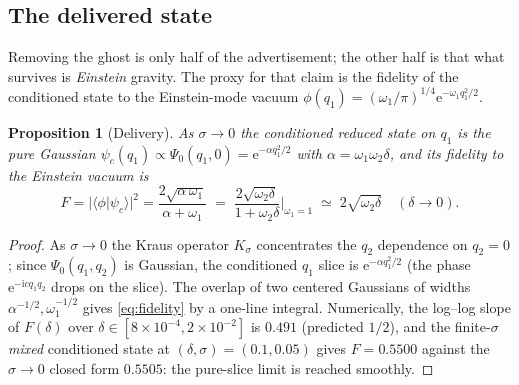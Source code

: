 \documentclass[11pt]{article}
\newtheorem{proposition}[theorem]{Proposition}
\theoremstyle{definition}
\theoremstyle{remark}
\newcommand{\ii}{\mathrm{i}}
\newcommand{\ee}{\mathrm{e}}
\begin{document}
\subsection{The delivered state}

Removing the ghost is only half of the advertisement; the other half
is that what survives is \emph{Einstein} gravity. The proxy for that
claim is the fidelity of the conditioned state to the Einstein-mode
vacuum $\phi(q_{1})=(\omega_{1}/\pi)^{1/4}
\ee^{-\omega_{1}q_{1}^{2}/2}$.

\begin{proposition}[Delivery]
\label{prop:delivery}
As $\sigma\to0$ the conditioned reduced state on $q_{1}$ is the pure
Gaussian $\psi_{c}(q_{1})\propto\Psi_{0}(q_{1},0)
=\ee^{-\alpha q_{1}^{2}/2}$ with $\alpha=\omega_{1}\omega_{2}\delta$, and its
fidelity to the Einstein vacuum is
\begin{equation}
F=\bigl|\langle\phi|\psi_{c}\rangle\bigr|^{2}
=\frac{2\sqrt{\alpha\,\omega_{1}}}{\alpha+\omega_{1}}
\;=\;\frac{2\sqrt{\omega_{2}\delta}}{1+\omega_{2}\delta}
\Big|_{\omega_{1}=1}
\;\simeq\;2\sqrt{\omega_{2}\delta}
\quad(\delta\to0).
\label{eq:fidelity}
\end{equation}
\end{proposition}

\begin{proof}
As $\sigma\to0$ the Kraus operator $K_{\sigma}$ concentrates the
$q_{2}$ dependence on $q_{2}=0$; since
$\Psi_{0}(q_{1},q_{2})$ is Gaussian, the conditioned $q_{1}$ slice is
$\ee^{-\alpha q_{1}^{2}/2}$ (the phase $\ee^{-\ii cq_{1}q_{2}}$ drops on the
slice). The overlap of two centered Gaussians of widths
$\alpha^{-1/2},\omega_{1}^{-1/2}$ gives \eqref{eq:fidelity} by a one-line
integral. Numerically, the log--log slope of $F(\delta)$ over
$\delta\in[8\times10^{-4},2\times10^{-2}]$ is $0.491$
(predicted $1/2$), and the finite-$\sigma$ \emph{mixed} conditioned
state at $(\delta,\sigma)=(0.1,0.05)$ gives $F=0.5500$ against the
$\sigma\to0$ closed form $0.5505$: the pure-slice limit is reached
smoothly.
\end{proof}
\end{document}
